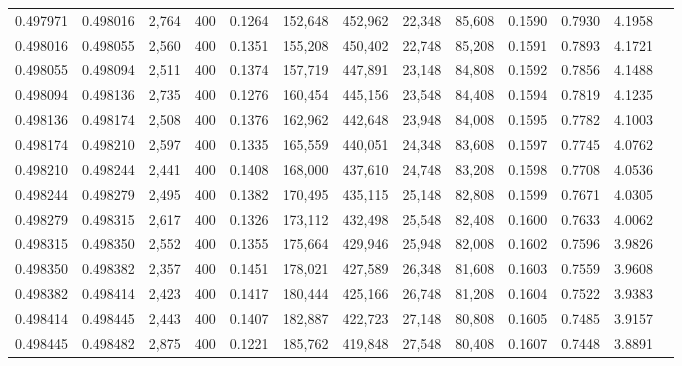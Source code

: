 \begin{tabular}{rrrrrrrrrrrrr}
0.497971 & 0.498016 & 2,764 & 400 &                                     0.1264 & 152,648 & 452,962 &  22,348 &  85,608 & 0.1590 & 0.7930 & 4.1958 \\
0.498016 & 0.498055 & 2,560 & 400 &                                     0.1351 & 155,208 & 450,402 &  22,748 &  85,208 & 0.1591 & 0.7893 & 4.1721 \\
0.498055 & 0.498094 & 2,511 & 400 &                                     0.1374 & 157,719 & 447,891 &  23,148 &  84,808 & 0.1592 & 0.7856 & 4.1488 \\
0.498094 & 0.498136 & 2,735 & 400 &                                     0.1276 & 160,454 & 445,156 &  23,548 &  84,408 & 0.1594 & 0.7819 & 4.1235 \\
0.498136 & 0.498174 & 2,508 & 400 &                                     0.1376 & 162,962 & 442,648 &  23,948 &  84,008 & 0.1595 & 0.7782 & 4.1003 \\
0.498174 & 0.498210 & 2,597 & 400 &                                     0.1335 & 165,559 & 440,051 &  24,348 &  83,608 & 0.1597 & 0.7745 & 4.0762 \\
0.498210 & 0.498244 & 2,441 & 400 &                                     0.1408 & 168,000 & 437,610 &  24,748 &  83,208 & 0.1598 & 0.7708 & 4.0536 \\
0.498244 & 0.498279 & 2,495 & 400 &                                     0.1382 & 170,495 & 435,115 &  25,148 &  82,808 & 0.1599 & 0.7671 & 4.0305 \\
0.498279 & 0.498315 & 2,617 & 400 &                                     0.1326 & 173,112 & 432,498 &  25,548 &  82,408 & 0.1600 & 0.7633 & 4.0062 \\
0.498315 & 0.498350 & 2,552 & 400 &                                     0.1355 & 175,664 & 429,946 &  25,948 &  82,008 & 0.1602 & 0.7596 & 3.9826 \\
0.498350 & 0.498382 & 2,357 & 400 &                                     0.1451 & 178,021 & 427,589 &  26,348 &  81,608 & 0.1603 & 0.7559 & 3.9608 \\
0.498382 & 0.498414 & 2,423 & 400 &                                     0.1417 & 180,444 & 425,166 &  26,748 &  81,208 & 0.1604 & 0.7522 & 3.9383 \\
0.498414 & 0.498445 & 2,443 & 400 &                                     0.1407 & 182,887 & 422,723 &  27,148 &  80,808 & 0.1605 & 0.7485 & 3.9157 \\
0.498445 & 0.498482 & 2,875 & 400 &                                     0.1221 & 185,762 & 419,848 &  27,548 &  80,408 & 0.1607 & 0.7448 & 3.8891 \\

\end{tabular}
